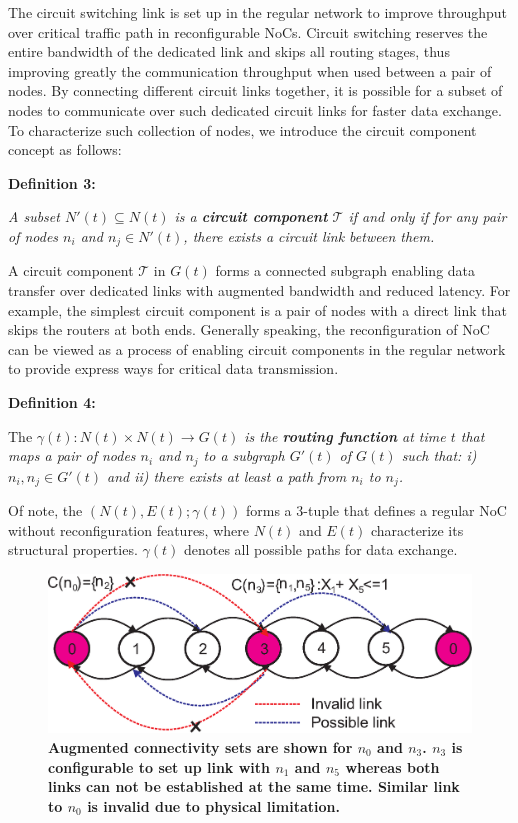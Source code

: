 The circuit switching link is set up in the regular network to improve throughput over critical traffic path in reconfigurable NoCs.  Circuit switching reserves the entire bandwidth of the dedicated link and skips all routing stages, thus improving greatly the communication throughput when used between a pair of nodes. By connecting different circuit links together, it is possible for a subset of nodes to communicate over such dedicated circuit links for faster data exchange. To characterize such collection of nodes, we introduce the circuit component concept as follows:

\noindent \textbf{Definition 3:}{ \textit{A subset $N'(t) \subseteq N(t)$ is a \textbf{circuit component} $\mathcal T$ if and only if for any pair of nodes $ n_i$ and $n_j \in N'(t)$, there exists a circuit link between them.}\label{def:circuit_component}

A circuit component $\mathcal T$ in $G(t)$ forms a connected subgraph enabling data transfer over dedicated links with augmented bandwidth and reduced latency. For example, %
the simplest circuit component is a pair of nodes with a direct link that skips the routers at both ends. Generally speaking, the reconfiguration of NoC can be viewed as a process of enabling circuit components in the regular network to provide express ways for critical data transmission. 

\noindent \textbf{Definition 4:}{ The \textit{$\gamma(t): N(t) \times N(t) \rightarrow G(t)$ is the \textbf{routing function} at time $t$ that maps a pair of nodes $n_{i}$ and $n_{j}$ to a subgraph $G'(t)$ of $G(t)$ such that: i) $n_{i},n_{j} \in G'(t)$ and ii) there exists at least a path from $n_i$ to $n_j$. } 

\noindent Of note, the $(N(t),E(t);\gamma(t))$ forms a 3-tuple that defines a regular NoC without reconfiguration  features, where $N(t)$ and $E(t)$ characterize its structural properties. $\gamma(t)$ denotes all possible paths for data exchange. 
\begin{figure}%
  \centering
  \includegraphics[width=0.8\columnwidth]{alter_set.eps}
  \vskip -1mm
  \caption{\textbf{Augmented connectivity sets are shown for $n_{0}$ and $n_{3}$. $n_{3}$ is configurable to set up link with $n_1$ and $n_5$ whereas both links can not be established at the same time. Similar link to $n_0$ is invalid due to physical limitation.} }
  \label{fig:augment}
  \vskip -6mm
\end{figure}

}}
